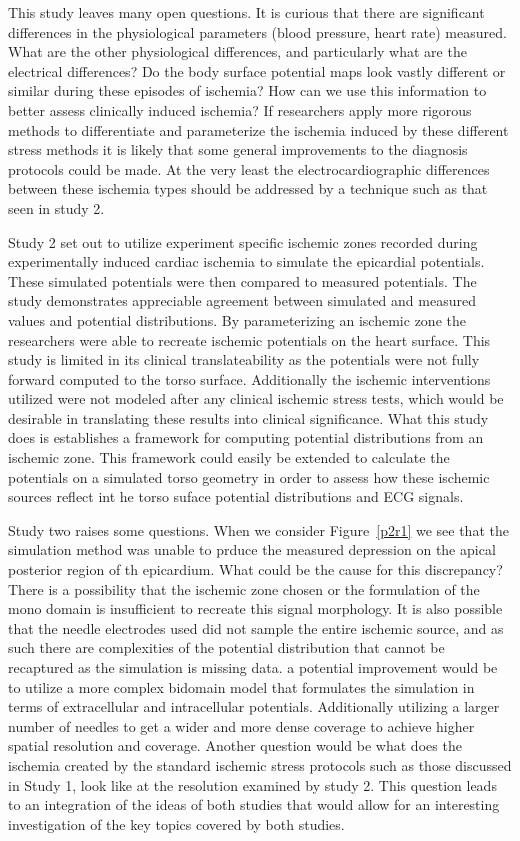 \documentclass[12pt]{article}
\begin{document}
This study leaves many open questions. It is curious that there are significant differences in the physiological parameters (blood pressure, heart rate) measured. What are the other physiological differences, and particularly what are the electrical differences? Do the body surface potential maps look vastly different or similar during these episodes of ischemia? How can we use this information to better assess clinically induced ischemia? If researchers apply more rigorous methods to differentiate and parameterize the ischemia induced by these different stress methods it is likely that some general improvements to the diagnosis protocols could be made. At the very least the electrocardiographic differences between these ischemia types should be addressed by a technique such as that seen in study 2. 


Study 2 set out to utilize experiment specific ischemic zones recorded during experimentally induced cardiac ischemia to simulate the epicardial potentials. These simulated potentials were then compared to measured potentials. The study demonstrates appreciable agreement between simulated and measured values and potential distributions. By parameterizing an ischemic zone the researchers were able to recreate ischemic potentials on the heart surface. This study is limited in its clinical translateability as the potentials were not fully forward computed to the torso surface. Additionally the ischemic interventions utilized were not modeled after any clinical ischemic stress tests, which would be desirable in translating these results into clinical significance. What this study does is establishes a framework for computing potential distributions from an ischemic zone. This framework could easily be extended to calculate the potentials on a simulated torso geometry in order to assess how these ischemic sources reflect int he torso suface potential distributions and ECG signals. 

Study two raises some questions. When we consider Figure~\ref{p2r1} we see that the simulation method was unable to prduce the measured depression on the apical posterior region of th epicardium. What could be the cause for this discrepancy? There is a possibility that the ischemic zone chosen or the formulation of the mono domain is insufficient to recreate this signal morphology. It is also possible that the needle electrodes used did not sample the entire ischemic source, and as such there are complexities of the potential distribution that cannot be recaptured as the simulation is missing data. a potential improvement would be to utilize a more complex bidomain model that formulates the simulation in terms of extracellular and intracellular potentials. Additionally utilizing a larger number of needles to get a wider and more dense coverage to achieve higher spatial resolution and coverage. Another question would be what does the ischemia created by the standard ischemic stress protocols such as those discussed in Study 1, look like at the resolution examined by study 2. This question leads to an integration of the ideas of both studies that would allow for an interesting investigation of the key topics covered by both studies.
\end{document}
